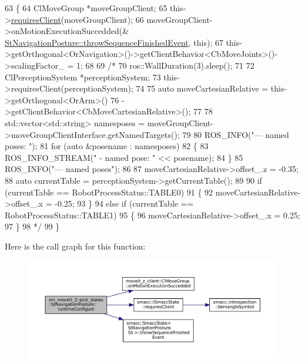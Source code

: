 \begin{DoxyCode}
63     \{
64         ClMoveGroup *moveGroupClient;
65         this->\hyperlink{classsmacc_1_1ISmaccState_a7f95c9f0a6ea2d6f18d1aec0519de4ac}{requiresClient}(moveGroupClient);
66         moveGroupClient->onMotionExecutionSuccedded(&
      \hyperlink{classsmacc_1_1SmaccState_a49dcfc25824f7e083dd4b999c49ab2b6}{StNavigationPosture::throwSequenceFinishedEvent}, \textcolor{keyword}{this});
67         this->getOrthogonal<OrNavigation>()->getClientBehavior<CbMoveJoints>()->scalingFactor\_ = 1;
68 
69         \textcolor{comment}{/*}
70 \textcolor{comment}{        ros::WallDuration(3).sleep();}
71 \textcolor{comment}{}
72 \textcolor{comment}{        ClPerceptionSystem *perceptionSystem;}
73 \textcolor{comment}{        this->requiresClient(perceptionSystem);}
74 \textcolor{comment}{}
75 \textcolor{comment}{        auto moveCartesianRelative = this->getOrthogonal<OrArm>()}
76 \textcolor{comment}{                                         ->getClientBehavior<CbMoveCartesianRelative>();}
77 \textcolor{comment}{}
78 \textcolor{comment}{        std::vector<std::string> namesposes = moveGroupClient->moveGroupClientInterface.getNamedTargets();}
79 \textcolor{comment}{}
80 \textcolor{comment}{        ROS\_INFO("--- named poses: ");}
81 \textcolor{comment}{        for (auto &posename : namesposes)}
82 \textcolor{comment}{        \{}
83 \textcolor{comment}{            ROS\_INFO\_STREAM(" - named pose: " << posename);}
84 \textcolor{comment}{        \}}
85 \textcolor{comment}{        ROS\_INFO("--- named poses");}
86 \textcolor{comment}{}
87 \textcolor{comment}{        moveCartesianRelative->offset\_.z = -0.35;}
88 \textcolor{comment}{        auto currentTable = perceptionSystem->getCurrentTable();}
89 \textcolor{comment}{}
90 \textcolor{comment}{        if (currentTable == RobotProcessStatus::TABLE0)}
91 \textcolor{comment}{        \{}
92 \textcolor{comment}{            moveCartesianRelative->offset\_.x = -0.25;}
93 \textcolor{comment}{        \}}
94 \textcolor{comment}{        else if (currentTable == RobotProcessStatus::TABLE1)}
95 \textcolor{comment}{        \{}
96 \textcolor{comment}{            moveCartesianRelative->offset\_.x = 0.25;}
97 \textcolor{comment}{        \}}
98 \textcolor{comment}{    */}
99     \}
\end{DoxyCode}
Here is the call graph for this function\+:
\nopagebreak
\begin{figure}[H]
\begin{center}
\leavevmode
\includegraphics[width=350pt]{structsm__moveit__2_1_1pick__states_1_1StNavigationPosture_a0cec0d8766ab498b7a1f588c79e09e7a_cgraph}
\end{center}
\end{figure}
